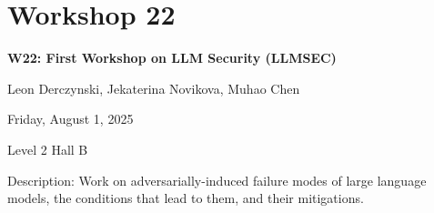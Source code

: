 \clearpage


\section[W22: First Workshop on LLM Security (LLMSEC)]{Workshop 22}
\label{workshop_22}

\begin{center}
    {\Large \textbf{W22: First Workshop on LLM Security (LLMSEC)}}\\
    
 \vspace{5mm}

Leon Derczynski, Jekaterina Novikova, Muhao Chen\\

 \vspace{5mm}

    Friday, August 1, 2025

   Level 2 Hall B
    
\end{center}

Description: Work on adversarially-induced failure modes of large language models, the conditions that lead to them, and their mitigations.

